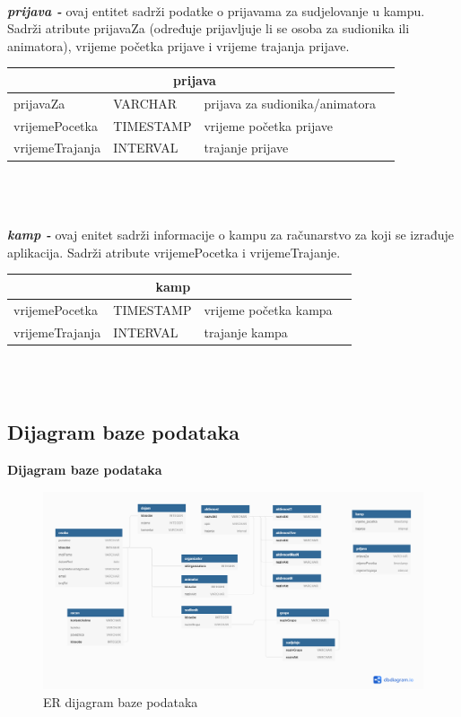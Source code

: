 \\
\textbf{\textit{prijava -}} ovaj entitet sadrži podatke o prijavama za sudjelovanje u kampu. Sadrži atribute prijavaZa (određuje prijavljuje li se osoba za sudionika ili animatora), vrijeme početka prijave i vrijeme trajanja prijave. \\
\begin{tabular}{|l|l|l|l|}
	
	\hline \multicolumn{3}{|c|}{\textbf{prijava}}\\	\hline
	
	prijavaZa	&	VARCHAR	&	prijava za sudionika/animatora\\ \hline
	vrijemePocetka	&	TIMESTAMP	&	vrijeme početka prijave\\ \hline
	vrijemeTrajanja	&	INTERVAL	&	trajanje prijave\\ \hline
\end{tabular} \\ \\
\\
\textbf{\textit{kamp -}} ovaj enitet sadrži informacije o kampu za računarstvo za koji se izrađuje aplikacija. Sadrži atribute vrijemePocetka i vrijemeTrajanje.\\
\begin{tabular}{|l|l|l|l|}
	
	\hline \multicolumn{3}{|c|}{\textbf{kamp}}\\	  \hline
	
	vrijemePocetka	&	TIMESTAMP	&	vrijeme početka kampa\\ \hline
	vrijemeTrajanja	&	INTERVAL	&	trajanje kampa\\ \hline
\end{tabular} \\ \\


			
			
			\subsection{Dijagram baze podataka}
\vspace {10pt} \textbf {Dijagram baze podataka}\\
\begin{figure}[htb]
	\centering
	\includegraphics[scale=0.25]{dijagrami/dataBase.PNG}
	\caption{ER dijagram baze podataka}
	\label{fig: dijagram baze}
\end{figure}
			
